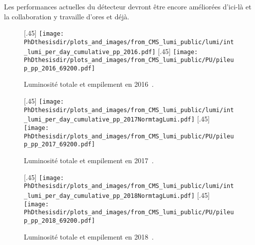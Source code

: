 Les performances actuelles du détecteur devront être encore améliorées d'ici-là et la collaboration y travaille d'ores et déjà.
\begin{figure}[p]
\centering

[.45\textwidth]
{\texttt{[image: \\PhDthesisdir/plots\_and\_images/from\_CMS\_lumi\_public/lumi/int\_lumi\_per\_day\_cumulative\_pp\_2016.pdf]}}
\hfill
{}[.45\textwidth]
{\texttt{[image: \\PhDthesisdir/plots\_and\_images/from\_CMS\_lumi\_public/PU/pileup\_pp\_2016\_69200.pdf]}}
\caption[Luminosité totale et empilement en 2016.]{Luminosité totale et empilement en 2016~\cite{CMS_lumi_public,CMS-PAS-LUM-17-001}.}
\label{fig-CMS_int_lumi_and_PU2016}

\vspace{.75\baselineskip}

[.45\textwidth]
{\texttt{[image: \\PhDthesisdir/plots\_and\_images/from\_CMS\_lumi\_public/lumi/int\_lumi\_per\_day\_cumulative\_pp\_2017NormtagLumi.pdf]}}
\hfill
{}[.45\textwidth]
{\texttt{[image: \\PhDthesisdir/plots\_and\_images/from\_CMS\_lumi\_public/PU/pileup\_pp\_2017\_69200.pdf]}}
\caption[Luminosité totale et empilement en 2017.]{Luminosité totale et empilement en 2017~\cite{CMS_lumi_public,CMS-PAS-LUM-17-004}.}
\label{fig-CMS_int_lumi_and_PU2017}

\vspace{.75\baselineskip}

[.45\textwidth]
{\texttt{[image: \\PhDthesisdir/plots\_and\_images/from\_CMS\_lumi\_public/lumi/int\_lumi\_per\_day\_cumulative\_pp\_2018NormtagLumi.pdf]}}
\hfill
{}[.45\textwidth]
{\texttt{[image: \\PhDthesisdir/plots\_and\_images/from\_CMS\_lumi\_public/PU/pileup\_pp\_2018\_69200.pdf]}}
\caption[Luminosité totale et empilement en 2018.]{Luminosité totale et empilement en 2018~\cite{CMS_lumi_public,CMS-PAS-LUM-18-002}.}
\label{fig-CMS_int_lumi_and_PU2018}
\end{figure}
